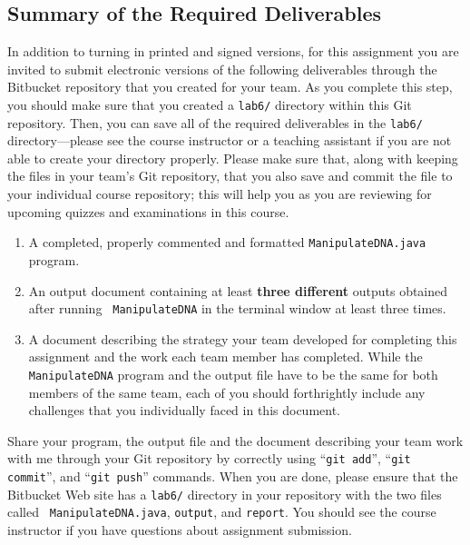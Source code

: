\vspace{-0.25in}
\subsection*{Summary of the Required Deliverables}
\vspace{-0.05in}

In addition to turning in printed and signed versions, for this assignment you are invited to submit electronic versions
of the following deliverables through the Bitbucket repository that you created for your team. As you complete this
step, you should make sure that you created a {\tt lab6/} directory within this Git repository.  Then, you can save all
of the required deliverables in the {\tt lab6/} directory---please see the course instructor or a teaching assistant if
you are not able to create your directory properly. Please make sure that, along with keeping the files in your team's
Git repository, that you also save and commit the file to your individual course repository; this will help you as you
are reviewing for upcoming quizzes and examinations in this course.

\vspace*{-.1in}
\begin{enumerate}

  \itemsep0in

  \item A completed, properly commented and formatted {\tt ManipulateDNA.java} program.

  \item An output document containing at least \textbf{three different} outputs obtained after running {\tt
    ManipulateDNA} in the terminal window at least three times.

  \item A document describing the strategy your team developed for completing this assignment and the work each team
    member has completed. While the {\tt ManipulateDNA} program and the output file have to be the same for both members
    of the same team, each of you should forthrightly include any challenges that you individually faced in this document.

\end{enumerate}
\vspace{-0.1in}

Share your program, the output file and the document describing your team work with me through your Git repository by
correctly using ``{\tt git add}'', ``{\tt git commit}'', and ``{\tt git push}'' commands. When you are done, please
ensure that the Bitbucket Web site has a {\tt lab6/} directory in your repository with the two files called {\tt
ManipulateDNA.java}, {\tt output}, and {\tt report}. You should see the course instructor if you have questions about
assignment submission.

